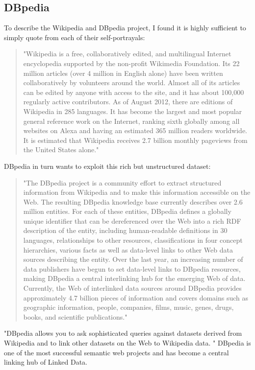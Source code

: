 \subsection{DBpedia}
To describe the Wikipedia and DBpedia project, I found it is highly sufficient to simply quote from each of their self-portrayals:
\begin{quote}
"Wikipedia is a free, collaboratively edited, and multilingual Internet encyclopedia supported by the non-profit Wikimedia Foundation. Its 22 million articles (over 4 million in English alone) have been written collaboratively by volunteers around the world. Almost all of its articles can be edited by anyone with access to the site, and it has about 100,000 regularly active contributors. As of August 2012, there are editions of Wikipedia in 285 languages. It has become the largest and most popular general reference work on the Internet, ranking sixth globally among all websites on Alexa and having an estimated 365 million readers worldwide. It is estimated that Wikipedia receives 2.7 billion monthly pageviews from the United States alone."
\end{quote}
DBpedia in turn wants to exploit this rich but unstructured dataset:
\begin{quote}
"The DBpedia project is a community effort to extract structured information
from Wikipedia and to make this information accessible on the Web. The resulting
DBpedia knowledge base currently describes over 2.6 million entities. For each of
these entities, DBpedia defines a globally unique identifier that can be dereferenced
over the Web into a rich RDF description of the entity, including human-readable
definitions in 30 languages, relationships to other resources, classifications in four
concept hierarchies, various facts as well as data-level links to other Web data
sources describing the entity. Over the last year, an increasing number of data
publishers have begun to set data-level links to DBpedia resources, making DBpedia
a central interlinking hub for the emerging Web of data. Currently, the Web of
interlinked data sources around DBpedia provides approximately 4.7 billion pieces of
information and covers domains such as geographic information, people, companies,
films, music, genes, drugs, books, and scientific publications." \cite{dbpedia_jws_09}
\end{quote}

"DBpedia allows you to ask sophisticated queries against datasets derived from Wikipedia and to link other datasets on the Web to Wikipedia data.
"\cite{dbpedia_iswc}
DBpedia is one of the most successful semantic web projects and has become a central linking hub of Linked Data.


